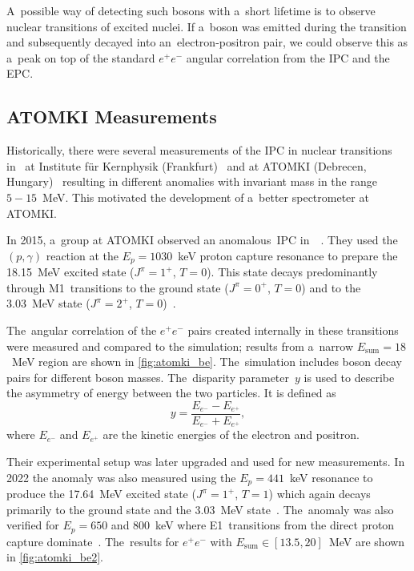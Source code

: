 		A~possible way of detecting such bosons with a~short lifetime is to observe nuclear transitions of excited nuclei. If a~boson was emitted during the transition and subsequently decayed into an~electron\nobreakdash-positron pair, we could observe this as a~peak on top of the standard $e^+e^-$ angular correlation from the \acf{IPC} and the \acf{EPC}.
	
		\subsection{ATOMKI Measurements}
			Historically, there were several measurements of the \ac{IPC} in nuclear transitions in~ at Institute für Kernphysik (Frankfurt)~\cite{ikf1996,ikf1997,ikf2001} and at ATOMKI (Debrecen, Hungary)~\cite{atomki2008,atomki2012} resulting in different anomalies with invariant mass in the range $5-15$~MeV. This motivated the development of a~better spectrometer at ATOMKI.
		
			In 2015, a~group at ATOMKI observed an anomalous~\ac{IPC} in~~\cite{atomki_be}. They used the $(p,\gamma)$ reaction at the $E_p = 1030$~keV proton capture resonance to prepare the 18.15~MeV excited state ($J^\pi = 1^{+}$, $T=0$). This state decays predominantly through M1~transitions to the ground state ($J^\pi = 0^{+}$, $T=0$) and to the 3.03~MeV state ($J^\pi = 2^{+}$, $T=0$)~\cite{resonances}.
			
			The~angular correlation of the $e^+ e^-$ pairs created internally in these transitions were measured and compared to the simulation; results from a~narrow $E_\text{sum}=18$~MeV region are shown in \cref{fig:atomki_be}. The~simulation includes boson decay pairs for different boson masses. The~disparity parameter~$y$ is used to describe the asymmetry of energy between the two particles. It is defined as
				\begin{equation}
					\label{eq:dispar}
					y = \frac{E_{e^-}-E_{e^+}}{E_{e^-}+E_{e^+}},
				\end{equation}
			where $E_{e^-}$ and $E_{e^+}$ are the kinetic energies of the electron and positron.
			
			Their experimental setup was later upgraded and used for new measurements. In 2022 the  anomaly was also measured using the $E_p = 441$~keV resonance to produce the 17.64~MeV excited state ($J^\pi = 1^{+}$, $T=1$) which again decays primarily to the ground state and the 3.03~MeV state~\cite{resonances}. The~anomaly was also verified for $E_p = 650$ and 800~keV where E1~transitions from the direct proton capture dominate~\cite{atomki_be2}. The~results for $e^+e^-$ with ${E_\text{sum}\in[13.5,20]}$~MeV are shown in \cref{fig:atomki_be2}.
			
